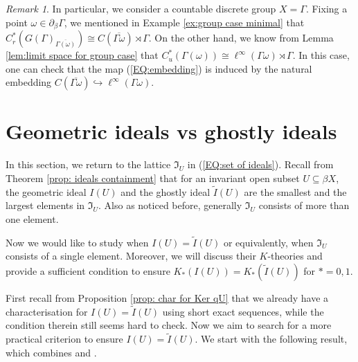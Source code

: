 \documentclass[12pt, a4paper]{amsart}
\numberwithin{equation}{section}
\theoremstyle{definition}
\theoremstyle{remark}
\newtheorem{rem}[thm]{Remark}
\begin{document}
\begin{rem}
In particular, we consider a countable discrete group $X =\Gamma$. Fixing a point $\omega \in \partial_\beta \Gamma$, we mentioned in Example \ref{ex:group case minimal} that $C^*_r(G(\Gamma)_{\overline{\Gamma(\omega)}}) \cong C(\overline{\Gamma \omega}) \rtimes \Gamma$. On the other hand, we know from Lemma \ref{lem:limit space for group case} that $C^*_u(\Gamma(\omega)) \cong \ell^\infty(\Gamma \omega) \rtimes \Gamma$. In this case, one can check that the map (\ref{EQ:embedding}) is induced by the natural embedding $C(\overline{\Gamma \omega}) \hookrightarrow \ell^\infty(\Gamma \omega)$.
\end{rem}








\section{Geometric ideals vs ghostly ideals}\label{sec:geometric vs ghostly ideals}

In this section, we return to the lattice $\mathfrak{I}_U$ in (\ref{EQ:set of ideals}). Recall from Theorem \ref{prop: ideals containment} that for an invariant open subset $U \subseteq \beta X$, the geometric ideal $I(U)$ and the ghostly ideal $\tilde{I}(U)$ are the smallest and the largest elements in $\mathfrak{I}_U$. Also as noticed before, generally $\mathfrak{I}_U$ consists of more than one element. 

Now we would like to study when $I(U)=\tilde{I}(U)$ or equivalently, when $\mathfrak{I}_U$ consists of a single element. Moreover, we will discuss their $K$-theories and provide a sufficient condition to ensure $K_\ast(I(U))=K_\ast(\tilde{I}(U))$ for $\ast=0,1$.



First recall from Proposition \ref{prop: char for Ker qU} that we already have a characterisation for $I(U) = \tilde{I}(U)$ using short exact sequences, while the condition therein still seems hard to check. Now we aim to search for a more practical criterion to ensure $I(U) = \tilde{I}(U)$.
We start with the following result, which combines \cite[Theorem 4.4]{CW05} and \cite[Theorem 1.3]{RW14}. 
\end{document}
